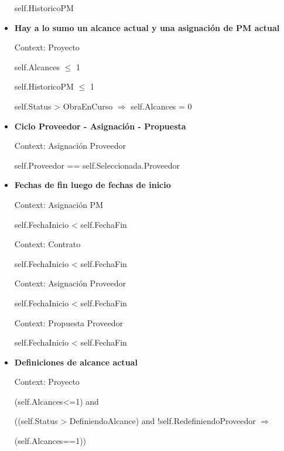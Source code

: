 \begin{itemize}
			self.HistoricoPM
	
	\item \textbf{Hay a lo sumo un alcance actual y una asignación de PM actual}
	
			Context: Proyecto
			
			self.Alcances $\leq$ 1
			
			self.HistoricoPM $\leq$ 1
			
			self.Status > ObraEnCurso $\Rightarrow$ self.Alcances = 0
			
	\item \textbf{Ciclo Proveedor - Asignaci\'on - Propuesta}
	
			Context: Asignación Proveedor
			
			self.Proveedor == self.Seleccionada.Proveedor
	
	\item \textbf{Fechas de fin luego de fechas de inicio}
			
			Context: Asignación PM
			
			self.FechaInicio < self.FechaFin
			
			Context: Contrato
			
			self.FechaInicio < self.FechaFin
			
			Context: Asignación Proveedor
			
			self.FechaInicio < self.FechaFin
			
			Context: Propuesta Proveedor
			
			self.FechaInicio < self.FechaFin			
	
	\item \textbf{Definiciones de alcance actual}
	
			Context: Proyecto
			
			(self.Alcances<=1) and
			
			((self.Status > DefiniendoAlcance) and !self.RedefiniendoProveedor $\Rightarrow$
			
			(self.Alcances==1))
			
	
\end{itemize}
